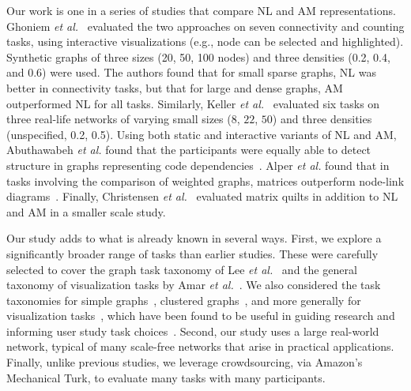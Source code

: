 Our work is one in a series of  studies that compare NL and AM representations. Ghoniem {\it et al.}~\cite{ghoniem2004comparison} evaluated the two approaches on seven connectivity and counting tasks, using interactive visualizations (e.g., node can be selected and highlighted). 
Synthetic graphs of three sizes (20, 50, 100 nodes) and three densities (0.2, 0.4, and 0.6) were used. The authors found that for small sparse graphs, NL was better in connectivity tasks, but that for large and dense graphs, AM outperformed NL for all tasks. Similarly, Keller {\it et al.}~\cite{keller2006matrices} evaluated six tasks on three real-life networks of varying small sizes ($8$, $22$, $50$) and  three densities (unspecified, 0.2, 0.5). Using both static and interactive variants of NL and AM,  Abuthawabeh {\it et al.} found that the participants were equally able to detect structure in graphs representing code dependencies~\cite{abuthawabeh2013finding}. 
Alper {\it et al.} found that in tasks involving the comparison of weighted graphs, matrices outperform node-link diagrams~\cite{alper2013weighted}. Finally, Christensen {\it et al.}~\cite{christensen2014understanding} evaluated matrix quilts in addition to NL and AM in a smaller scale study. 

Our study adds to what is already known in several ways. 
First, we explore a significantly broader range of tasks than earlier studies. These were carefully selected to cover the graph task taxonomy of Lee {\it et al.}~\cite{lee2006task} and the general taxonomy of visualization tasks by Amar {\it et al.}~\cite{amar2005low}. We also considered the task taxonomies for simple graphs~\cite{lee2006task},  clustered graphs~\cite{saket2014group}, and more generally for visualization tasks~\cite{amar2005low,shneiderman1996eyes}, which have been found to be useful in guiding research and informing user study task choices~\cite{jianu2014display,saket2014node}. Second, our study uses a large real-world network, typical of many scale-free networks that arise in practical applications. 
Finally, unlike previous studies, we leverage crowdsourcing, via Amazon's Mechanical Turk, to evaluate many tasks with many participants. 

